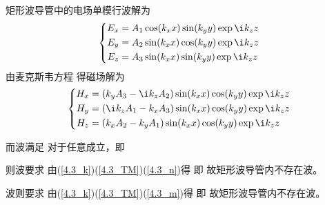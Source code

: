 
    矩形波导管中的电场单模行波解为
    \begin{equation}
        \left\{
            \begin{aligned}
                    E_x&=A_1\cos(k_xx)\sin(k_yy)\exp{\i k_zz}\\
                    E_y&=A_2\sin(k_xx)\cos(k_yy)\exp{\i k_zz}\\
                    E_z&=A_3\sin(k_xx)\sin(k_yy)\exp{\i k_zz}\\
            \end{aligned}
        \right.
    \end{equation}
    由麦克斯韦方程
    得磁场解为
    \begin{equation}
        \left\{
            \begin{aligned}
                    H_x&=(k_yA_3-\i k_zA_2)\sin(k_xx)\cos(k_yy)\exp{\i k_zz}\\
                    H_y&=(\i k_zA_1-k_xA_3)\sin(k_xx)\cos(k_yy)\exp{\i k_zz}\\
                    H_z&=(k_xA_2-k_yA_1)\sin(k_xx)\cos(k_yy)\exp{\i k_zz}\\
            \end{aligned}
        \right.
    \end{equation}
    
    而波满足
    对于任意成立，即
    
    则波要求
    由(\ref{4.3_k})(\ref{4.3_TM})(\ref{4.3_n})得
    即
    故矩形波导管内不存在波。
    
    波则要求
    由(\ref{4.3_k})(\ref{4.3_TM})(\ref{4.3_m})得
    即
    故矩形波导管内不存在波。
